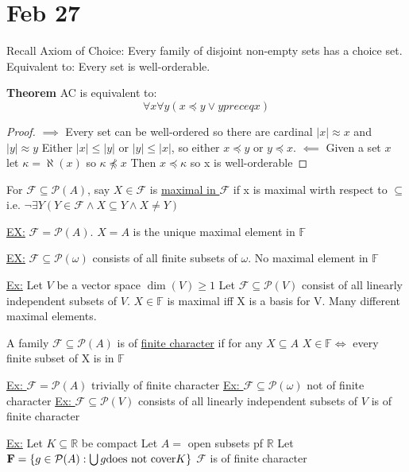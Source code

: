 
\section{Feb 27}

Recall Axiom of Choice: Every family of disjoint non-empty sets has a choice set.
Equivalent to: Every set is well-orderable.

\textbf{Theorem} AC is equivalent to:
\[\forall x \forall y (x \preceq y \vee y preceq x)\]

\begin{proof}
    $\implies$ Every set can be well-ordered so there are cardinal $|x| \approx x$ and $|y| \approx y$
    Either $|x| \leq |y|$ or $|y| \leq |x|$, so either $x \preceq y$ or $y \preceq x$.
    $\impliedby$ Given a set $x$ let $\kappa = \aleph(x)$ so $\kappa \npreceq x$
    Then $x \preceq \kappa$ so x is well-orderable
\end{proof}

\dfn For $\mathcal{F} \subseteq \mathcal{P}(A)$, say $X \in \mathcal{F}$ is \underline{maximal in $\mathcal{F}$} if x is maximal wirth respect to $\subseteq$
i.e. $\neg \exists Y (Y \in \mathcal{F} \wedge X \subseteq Y \wedge X \neq Y)$

\underline{EX:} $\mathcal{F} = \mathcal{P}(A)$.
$X=A$ is the unique maximal element in $\mathbb{F}$

\underline{EX:} $\mathcal{F} \subseteq \mathcal{P}(\omega)$ consists of all finite subsets of $\omega$.
No maximal element in $\mathbb{F}$

\underline{Ex:} Let $V$ be a vector space $\dim(V) \geq 1$
Let $\mathcal{F} \subseteq \mathcal{P}(V)$ consist of all linearly independent subsets of $V$.
$X \in \mathbb{F}$ is maximal iff X is a basis for V.
Many different maximal elements.

\dfn A family $\mathcal{F} \subseteq \mathcal{P}(A)$ is of \underline{finite character} if for any
$X \subseteq A$ $X \in \mathbb{F} \iff$ every finite subset of X is in $\mathbb{F}$

\underline{Ex: } $\mathcal{F} = \mathcal{P}(A)$ trivially of finite character
\underline{Ex: } $\mathcal{F} \subseteq \mathcal{P}(\omega)$ not of finite character
\underline{Ex: } $\mathcal{F} \subseteq \mathcal{P}(V)$ consists of all linearly independent subsets of $V$ is of finite character


\underline{Ex:} Let $K \subseteq \mathbb{R}$ be compact
Let $A = $ open subsets pf $\mathbb{R}$
Let $\mathbf{F} = \{g \in \mathcal{P}(A) : \bigcup g \text{does not cover} K\}$
$\mathcal{F}$ is of finite character

